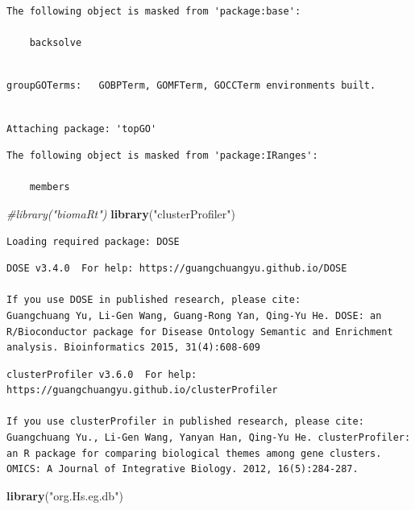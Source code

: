 \documentclass[]{article}
\newenvironment{Shaded}{\begin{snugshade}}{\end{snugshade}}
\newcommand{\KeywordTok}[1]{\textcolor[rgb]{0.13,0.29,0.53}{\textbf{#1}}}
\newcommand{\StringTok}[1]{\textcolor[rgb]{0.31,0.60,0.02}{#1}}
\newcommand{\CommentTok}[1]{\textcolor[rgb]{0.56,0.35,0.01}{\textit{#1}}}
\newcommand{\NormalTok}[1]{#1}
\begin{document}
\begin{verbatim}
The following object is masked from 'package:base':

    backsolve
\end{verbatim}

\begin{verbatim}

groupGOTerms:   GOBPTerm, GOMFTerm, GOCCTerm environments built.
\end{verbatim}

\begin{verbatim}

Attaching package: 'topGO'
\end{verbatim}

\begin{verbatim}
The following object is masked from 'package:IRanges':

    members
\end{verbatim}

\begin{Shaded}
\begin{Highlighting}[]
\CommentTok{#library("biomaRt")}
\KeywordTok{library}\NormalTok{(}\StringTok{"clusterProfiler"}\NormalTok{)}
\end{Highlighting}
\end{Shaded}

\begin{verbatim}
Loading required package: DOSE
\end{verbatim}

\begin{verbatim}
DOSE v3.4.0  For help: https://guangchuangyu.github.io/DOSE

If you use DOSE in published research, please cite:
Guangchuang Yu, Li-Gen Wang, Guang-Rong Yan, Qing-Yu He. DOSE: an R/Bioconductor package for Disease Ontology Semantic and Enrichment analysis. Bioinformatics 2015, 31(4):608-609
\end{verbatim}

\begin{verbatim}
clusterProfiler v3.6.0  For help: https://guangchuangyu.github.io/clusterProfiler

If you use clusterProfiler in published research, please cite:
Guangchuang Yu., Li-Gen Wang, Yanyan Han, Qing-Yu He. clusterProfiler: an R package for comparing biological themes among gene clusters. OMICS: A Journal of Integrative Biology. 2012, 16(5):284-287.
\end{verbatim}

\begin{Shaded}
\begin{Highlighting}[]
\KeywordTok{library}\NormalTok{(}\StringTok{"org.Hs.eg.db"}\NormalTok{)}
\end{Highlighting}
\end{Shaded}
\end{document}
